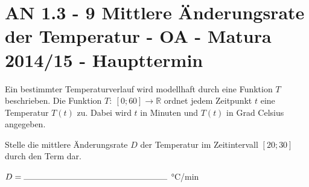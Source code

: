 \section{AN 1.3 - 9 Mittlere Änderungsrate der Temperatur - OA - Matura 2014/15 - Haupttermin}

\begin{beispiel}[AN 1.3]{1} %
Ein bestimmter Temperaturverlauf wird modellhaft durch eine Funktion $T$ beschrieben.
Die Funktion $T:~[0; 60] \rightarrow \mathbb{R}$ ordnet jedem Zeitpunkt $t$ eine Temperatur $T(t)$ zu. Dabei wird $t$ in Minuten und $T(t)$ in Grad Celsius angegeben. \leer

Stelle die mittlere Änderungsrate $D$ der Temperatur im Zeitintervall $[20;30]$ durch den Term dar. \leer

$D= \rule{6cm}{0.3pt}$ °C/min


\end{beispiel}
